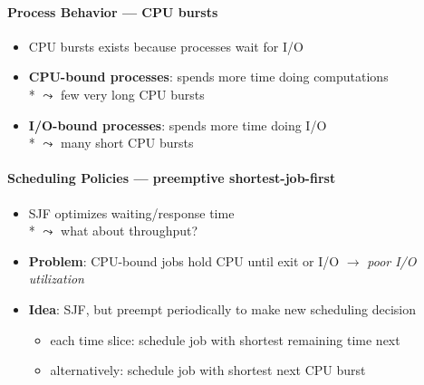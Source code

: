 \paragraph{Process Behavior --- CPU bursts}
\begin{itemize}
  \item CPU bursts exists because processes wait for I/O
  \item \textbf{CPU-bound processes}: spends more time doing computations \\*
    \( \leadsto \) few very long CPU bursts
  \item \textbf{I/O-bound processes}: spends more time doing I/O \\*
    \( \leadsto \) many short CPU bursts
\end{itemize}

\paragraph{Scheduling Policies --- preemptive shortest-job-first}
\begin{itemize}
  \item SJF optimizes waiting/response time \\*
    \( \leadsto \) what about throughput?
  \item \textbf{Problem}: CPU-bound jobs hold CPU until exit or I/O \( \to \) \emph{poor I/O utilization}
  \item \textbf{Idea}: SJF, but preempt periodically to make new scheduling decision
  \begin{itemize}
    \item each time slice: schedule job with shortest remaining time next
    \item alternatively: schedule job with shortest next CPU burst
  \end{itemize}
\end{itemize}

